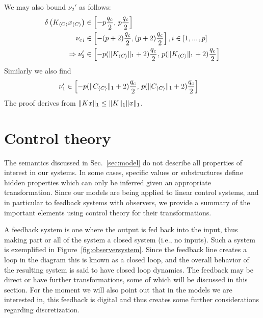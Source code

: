 \documentclass[sigconf]{llncs}
\DeclarePairedDelimiter\norm{\lVert}{\rVert}
\newcommand{\mat}[1]{{#1}}
\renewcommand{\vec}[1]{{#1}}
\begin{document}
We may also bound $\nu_2'$ as follows:
\begin{align*}
\delta\left(\mat{K}_{\langle C\rangle} \vec{x}_{\langle C\rangle} \right) &\in \left[ -p \frac{q_c}{2},\, p \frac{q_c}{2}\right]\\
{\vec{\nu_e}}_i &\in \left[ -(p+2) \frac{q_c}{2}, (p+2) \frac{q_c}{2}\right], i \in [1, ...\,,p]\\
\Rightarrow \nu_2' &\in \left[  -p(\norm{\mat{K}_{\langle C \rangle}}_1+2) \frac{q_c}{2},\, p(\norm{\mat{K}_{\langle C \rangle}}_1+2) \frac{q_c}{2}\right]
\end{align*}
Similarly we also find
\begin{align*}
\nu_1' &\in \left[  -p(\norm{\mat{C}_{\langle C \rangle}}_1+2) \frac{q_c}{2},\, p(\norm{\mat{C}_{\langle C \rangle}}_1+2) \frac{q_c}{2}\right]
\end{align*}
The proof derives from $\norm{\mat{K}\vec{x}}_1 \leq \norm{\mat{K}}_1\norm{\vec{x}}_1$.

\section{Control theory}\label{sec:control_theory}

The semantics discussed in Sec.~\ref{sec:model} do not describe all
properties of interest in our systems.  In some cases, specific values or
substructures define hidden properties which can only be inferred given an
appropriate transformation.  Since our models are being applied to linear
control systems, and in particular to feedback systems with observers, we
provide a summary of the important elements using control theory for their
transformations.

A feedback system is one where the output is fed back into the input, thus
making part or all of the system a closed system (i.e., no inputs).  Such a
system is exemplified in Figure~\ref{fig:observersystem}.  Since the
feedback line creates a loop in the diagram this is known as a closed loop,
and the overall behavior of the resulting system is said to have closed loop
dynamics.  The feedback may be direct or have further transformations, some
of which will be discussed in this section.  For the moment we will also
point out that in the models we are interested in, this feedback is digital
and thus creates some further considerations regarding discretization.
\end{document}

